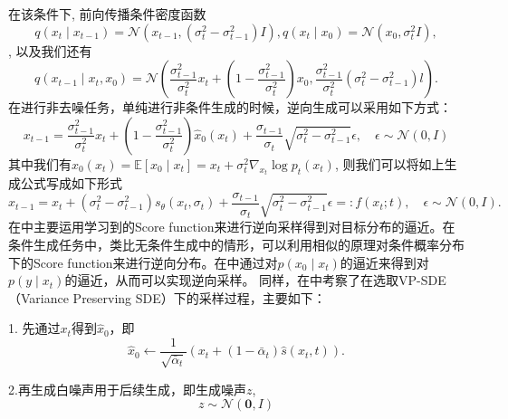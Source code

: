 在该条件下, 前向传播条件密度函数 
\begin{equation}
  q\left(x_t \mid x_{t-1}\right)=\mathcal{N}\left(x_{t-1},\left(\sigma_t^2-\sigma_{t-1}^2\right) I\right), q\left(x_t \mid x_0\right)=\mathcal{N}\left(x_0, \sigma_t^2 I\right),  
\end{equation}
, 以及我们还有
\begin{equation}
    q\left(x_{t-1} \mid x_t, x_0\right)=\mathcal{N}\left(\frac{\sigma_{t-1}^2}{\sigma_t^2} x_t+\left(1-\frac{\sigma_{t-1}^2}{\sigma_t^2}\right) x_0, \frac{\sigma_{t-1}^2}{\sigma_t^2}\left(\sigma_t^2-\sigma_{t-1}^2\right) l\right) .
\end{equation}
在进行非去噪任务，单纯进行非条件生成的时候，逆向生成可以采用如下方式：
\begin{equation}
    x_{t-1}=\frac{\sigma_{t-1}^2}{\sigma_t^2} x_t+\left(1-\frac{\sigma_{t-1}^2}{\sigma_t^2}\right) \hat{x}_0\left(x_t\right)+\frac{\sigma_{t-1}}{\sigma_t} \sqrt{\sigma_t^2-\sigma_{t-1}^2} \epsilon, \quad \epsilon \sim \mathcal{N}(0, I)
\end{equation}
其中我们有$\hat{x}_0\left(x_t\right)=\mathbb{E}\left[x_0 \mid x_t\right]=x_t+\sigma_t^2 \nabla_{x_t} \log p_t\left(x_t\right)$, 则我们可以将如上生成公式写成如下形式
\begin{equation}
    x_{t-1}=x_t+\left(\sigma_t^2-\sigma_{t-1}^2\right) s_\theta\left(x_t, \sigma_t\right)+\frac{\sigma_{t-1}}{\sigma_t} \sqrt{\sigma_t^2-\sigma_{t-1}^2} \epsilon=: f\left(x_t ; t\right), \quad \epsilon \sim \mathcal{N}(0, I).
    \label{reverse sampling}
\end{equation}
在\cite{song_2,DDPM}中主要运用学习到的Score function来进行逆向采样得到对目标分布的逼近。在条件生成任务中，类比无条件生成中的情形，可以利用相似的原理对条件概率分布下的Score function来进行逆向分布。在\cite{Inverse}中通过对$p(x_0\mid x_t)$的逼近来得到对$p(y\mid x_t)$的逼近，从而可以实现逆向采样。
同样，在\cite{Inverse}中考察了在选取VP-SDE（Variance Preserving SDE）下的采样过程，主要如下：      

1. 先通过$x_t$得到$\hat{x}_0$，即
\begin{equation}
    \hat{{x}}_0 \leftarrow \frac{1}{\sqrt{\bar{\alpha}_t}}\left({x}_t+\left(1-\bar{\alpha}_t\right) \hat{{s}}(x_t,t)\right).
\end{equation}
        
        2.再生成白噪声用于后续生成，即生成噪声$z$,
\begin{equation}
    {z} \sim \mathcal{N}(\mathbf{0}, {I}) 
\end{equation}
      
